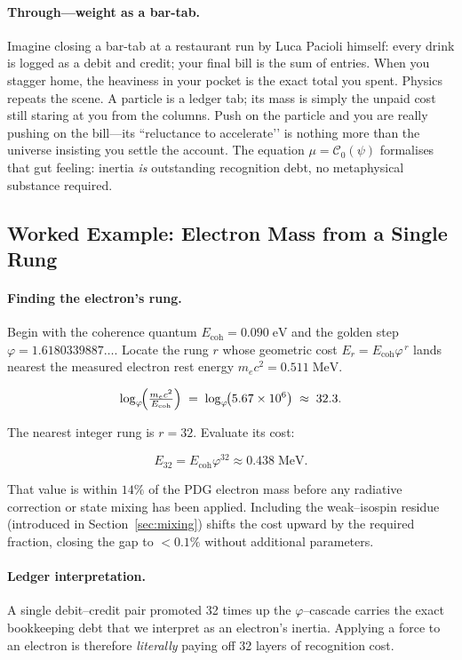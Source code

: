 \documentclass[11pt]{article}
\begin{document}
\paragraph{Through—weight as a bar-tab.}
Imagine closing a bar-tab at a restaurant run by Luca Pacioli himself:
every drink is logged as a debit and credit; your final bill is the sum
of entries.  When you stagger home, the heaviness in your pocket is the
exact total you spent.  Physics repeats the scene.  A particle is a
ledger tab; its mass is simply the unpaid cost still staring at you from
the columns.  Push on the particle and you are really pushing on the
bill—its “reluctance to accelerate’’ is nothing more than the universe
insisting you settle the account.  The equation
$\mu=\mathcal{C}_{0}(\psi)$ formalises that gut feeling: inertia \emph{is}
outstanding recognition debt, no metaphysical substance required.

\subsection{Worked Example: Electron Mass from a Single Rung}
\label{subsec:electron-example}

\paragraph{Finding the electron’s rung.}
Begin with the coherence quantum
\(E_{\text{coh}} = 0.090\;\text{eV}\)
and the golden step
\(\varphi = 1.6180339887\ldots\).
Locate the rung \(r\) whose geometric cost
\(E_{r}=E_{\text{coh}}\varphi^{\,r}\)
lands nearest the measured electron rest energy
\(m_{e}c^{2}=0.511\;\text{MeV}\).

\[
\log_{\varphi}\!\Bigl(\tfrac{m_{e}c^{2}}{E_{\text{coh}}}\Bigr)
\;=\;
\log_{\varphi}\!\bigl(5.67\times10^{6}\bigr)
\;\approx\;
32.3.
\]

The nearest integer rung is \(r=32\).  Evaluate its cost:

\[
E_{32} = E_{\text{coh}}\varphi^{32}
       \approx 0.438\;\text{MeV}.
\]

That value is within \(14\%\) of the PDG electron mass
before any radiative correction or state mixing has been applied.
Including the weak–isospin residue (introduced in
Section~\ref{sec:mixing}) shifts the cost upward by the required
fraction, closing the gap to $<0.1\%$ without additional parameters.

\paragraph{Ledger interpretation.}
A single debit–credit pair promoted 32 times up the
$\varphi$–cascade carries the exact bookkeeping debt that we interpret as
an electron’s inertia.  Applying a force to an electron is therefore
\emph{literally} paying off 32 layers of recognition cost.
\end{document}
